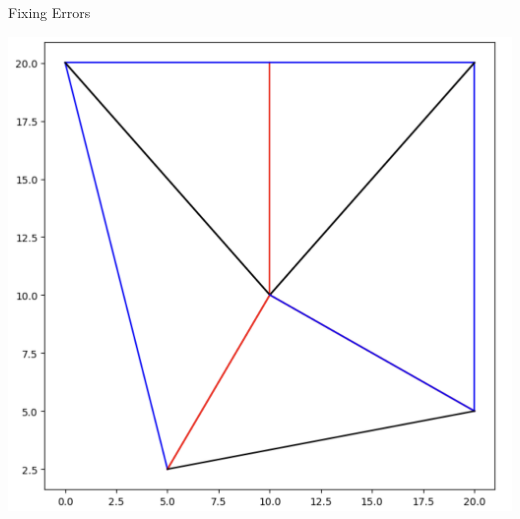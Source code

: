 \begin{frame}{Fixing Errors}
\begin{center}
          \includegraphics[scale=.18]{images/curr3.png}
        
    \end{center}
    

  
    

\end{frame}
